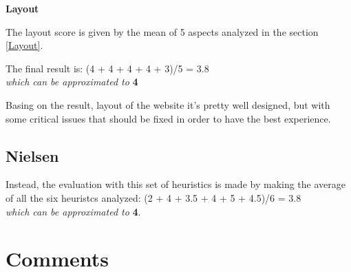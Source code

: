 \par\medskip

\textbf{Layout}\par
The layout score is given by the mean of 5 aspects analyzed in the section \ref{Layout}. \par
The final result is: 
(4 + 4 + 4 + 4 + 3)/5 = 3.8 \\
\textit{which can be approximated to} \textbf{4}\par
Basing on the result, layout of the website it's pretty well designed, but with some critical issues that should be fixed in order to have the best experience.

\begin{figure}[H]
  \centering
\end{figure}


\subsection{Nielsen}
Instead, the evaluation with this set of heuristics is made by making the average of all the six heuristcs analyzed:
(2 + 4 + 3.5 + 4 + 5 + 4.5)/6 = 3.8 \\
\textit{which can be approximated to} \textbf{4}.\par

\section{Comments}
